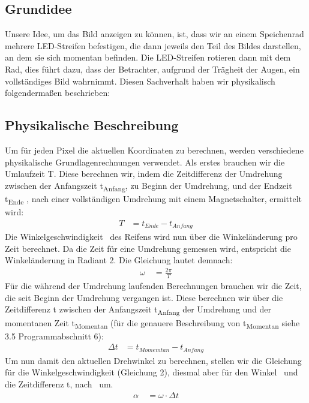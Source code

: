 \documentclass [a4paper, 11pt] {article}
\begin{document}
\subsection{Grundidee}
Unsere Idee, um das Bild anzeigen zu können, ist, dass wir an einem Speichenrad mehrere LED-Streifen befestigen, die dann jeweils den Teil des Bildes darstellen, an dem sie sich momentan befinden. Die LED-Streifen rotieren dann mit dem Rad, dies führt dazu, dass der Betrachter, aufgrund der Trägheit der Augen, ein vollständiges Bild wahrnimmt.
Diesen Sachverhalt haben wir physikalisch folgendermaßen beschrieben:

\subsection{Physikalische Beschreibung}
Um für jeden Pixel die aktuellen Koordinaten zu berechnen, werden verschiedene physikalische Grundlagenrechnungen verwendet.
Als erstes brauchen wir die Umlaufzeit T. Diese berechnen wir, indem die Zeitdifferenz der Umdrehung zwischen der Anfangszeit t\textsubscript{Anfang}, zu Beginn der Umdrehung, und der Endzeit t\textsubscript{Ende} , nach einer vollständigen Umdrehung mit einem Magnetschalter, ermittelt wird:
\begin{align}
T &= t_{Ende} - t_{Anfang}
\end{align}
Die Winkelgeschwindigkeit \textomega\ des Reifens wird nun über die Winkeländerung pro Zeit berechnet. Da die Zeit für eine Umdrehung gemessen wird, entspricht die Winkeländerung in Radiant 2\textpi. Die Gleichung lautet demnach:
\begin{align}
\omega\ &= \frac{2 \pi}{T}
\label{omega}
\end{align}
Für die während der Umdrehung laufenden Berechnungen brauchen wir die Zeit, die seit Beginn der Umdrehung vergangen ist. Diese berechnen wir über die Zeitdifferenz \textDelta t zwischen der Anfangszeit t\textsubscript{Anfang} der Umdrehung und der momentanen Zeit t\textsubscript{Momentan} (für die genauere Beschreibung von t\textsubscript{Momentan} siehe 3.5 Programmabschnitt 6):
\begin{align}
\Delta t &= t_{Momemtan} - t_{Anfang}
\end{align}
Um nun damit den aktuellen Drehwinkel zu berechnen, stellen wir die Gleichung für die Winkelgeschwindigkeit (Gleichung 2), diesmal aber für den Winkel \textalpha\  und die Zeitdifferenz \textDelta t, nach \textalpha\  um.  
\begin{align}
\alpha\ &= \omega \cdot \Delta t 
\end{align}
\end{document}
